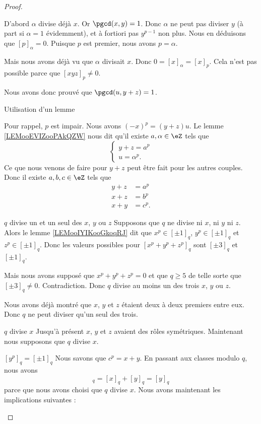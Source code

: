 \begin{proof}
\begin{subproof}
		D'abord \( \alpha\) divise déjà \( x\). Or \( \pgcd(x,y)=1\). Donc \( \alpha\) ne peut pas diviser \( y\) (à part si \( \alpha=1\) évidemment), et à fortiori pas \( y^{p-1}\) non plus. Nous en déduisons que \( [p]_{\alpha}=0\). Puisque \( p\) est premier, nous avons \( p=\alpha\).

		Mais nous avons déjà vu que \( \alpha\) divisait \( x\). Donc \( 0=[x]_{\alpha}=[x]_p\). Cela n'est pas possible parce que \( [xyz]_p\neq 0\).

		Nous avons donc prouvé que \( \pgcd(u,y+z)=1\).

		\item[Utilisation d'un lemme]

		Pour rappel, \( p\) est impair.  Nous avons \( (-x)^p=(y+z)u\). Le lemme \ref{LEMooEVIZooPAkQZW} nous dit qu'il existe \( a,\alpha\in \eZ\) tels que
		\begin{equation}        \label{EQooKMPZooCShIIT}
			\begin{cases}
				y+z=a^p \\
				u=\alpha^p.
			\end{cases}
		\end{equation}
		Ce que nous venons de faire pour \(y+z\) peut être fait pour les autres couples. Donc il existe \( a,b,c\in \eZ\) tels que
		\begin{subequations}
			\begin{align}
				y+z & =a^p  \\
				x+z & =b^p  \\
				x+y & =c^p.
			\end{align}
		\end{subequations}

		\item[\( q\) divise un et un seul des \( x\), \( y\) ou \( z\)]
		Supposons que \( q\) ne divise ni \( x\), ni \( y\) ni \( z\). Alors le lemme \ref{LEMooIYIKooGkoqRJ} dit que \( x^p\in [\pm 1]_q\), \( y^p\in [\pm 1]_q\) et \( z^p\in[\pm 1]_q\). Donc les valeurs possibles pour \( [x^p+y^p+z^p]_q\) sont \( [\pm 3]_q\) et \( [\pm 1]_q\).

		Mais nous avons supposé que \( x^p+y^p+z^p=0\) et que \( q\ge 5\) de telle sorte que \( [\pm3]_q\neq 0\). Contradiction. Donc \( q\) divise au moins un des trois \( x\), \( y\) ou \( z\).

		Nous avons déjà montré que \( x\), \( y\) et \( z\) étaient deux à deux premiers entre eux. Donc \( q\) ne peut diviser qu'un seul des trois.
		\item[\( q\) divise \( x\)]
		Jusqu'à présent \( x\), \( y\) et \(z \) avaient des rôles symétriques. Maintenant nous supposons que \( q\) divise \( x\).
		\item[\( {[y^p]_q=[\pm 1]_q}\)]
		Nous savons que \( c^p=x+y\). En passant aux classes modulo \( q\), nous avons
		\begin{equation}
			[c^p]_q=[x]_q+[y]_q=[y]_q
		\end{equation}
		parce que nous avons choisi que \( q\) divise \( x\). Nous avons maintenant les implications suivantes :


\end{subproof}
\end{proof}
